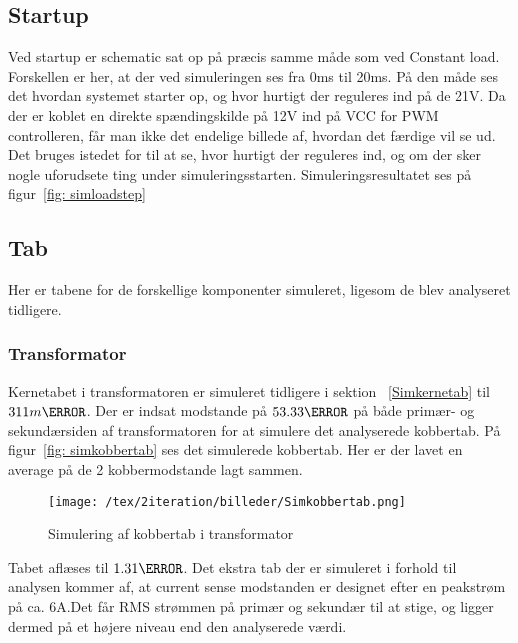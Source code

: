 \subsection{Startup}
Ved startup er schematic sat op på præcis samme måde som ved Constant load. Forskellen er her, at der ved simuleringen ses fra 0ms til 20ms. På den måde ses det hvordan systemet starter op, og hvor hurtigt der reguleres ind på de 21V. Da der er koblet en direkte spændingskilde på 12V ind på VCC for PWM controlleren, får man ikke det endelige billede af, hvordan det færdige vil se ud. Det bruges istedet for til at se, hvor hurtigt der reguleres ind, og om der sker nogle uforudsete ting under simuleringsstarten.
 Simuleringsresultatet ses på figur~\ref{fig: simloadstep} 

  

\subsection{Tab}
Her er tabene for de forskellige komponenter simuleret, ligesom de blev analyseret tidligere.

\subsubsection{Transformator}
Kernetabet i transformatoren er simuleret tidligere i sektion ~\ref{Simkernetab} til $311m\watt$. Der er indsat modstande på $53.33\ohm$ på både primær- og sekundærsiden af transformatoren for at simulere det analyserede kobbertab. På figur~\ref{fig: simkobbertab} ses det simulerede kobbertab. Her er der lavet en average på de 2 kobbermodstande lagt sammen. 
\begin{figure}[H]
	\center
	\texttt{[image: /tex/2iteration/billeder/Simkobbertab.png]}
	\caption{Simulering af kobbertab i transformator}
	\label{fig: Simkobbertab}
\end{figure}
Tabet aflæses til $1.31\watt$. Det ekstra tab der er simuleret i forhold til analysen kommer af, at current sense modstanden er designet efter en peakstrøm på ca. 6A.Det får RMS strømmen på primær og sekundær til at stige, og ligger dermed på et højere niveau end den analyserede værdi.
